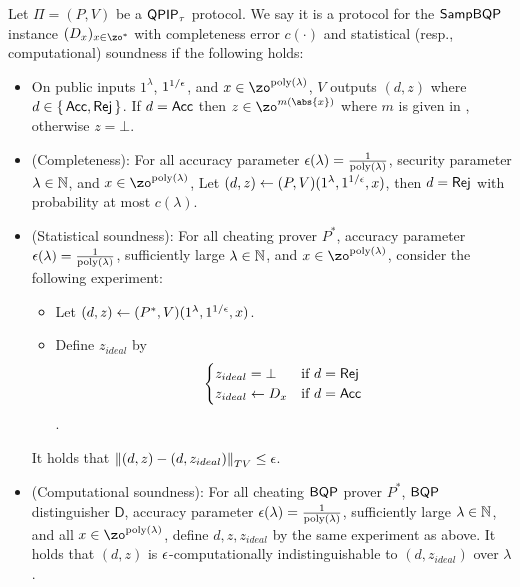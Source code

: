 \begin{definition}
    \label{dfn:stats-secure-proto-sampbqp}
    Let $\Pi=(P, V)$ be a $\operatorname{\mathsf{QPIP}}_\tau$ protocol.
    We say it is a protocol for the $\operatorname{\mathsf{SampBQP}}$ instance $(D_x)_{x\in\zo^*}$ with completeness error $c(\cdot)$ and statistical (resp., computational) soundness if the following holds:
    \begin{itemize}
        \item On public inputs $1^\lambda$, $1^{1/\epsilon}$, and $x\in\zo^{\poly(\lambda)}$, $V$ outputs $(d, z)$ where $d\in\set{\mathsf{Acc}, \mathsf{Rej}}$.
            If $d=\mathsf{Acc}$ then $z\in\zo^{m(\abs{x})}$ where $m$ is given in , otherwise $z=\bot$.
        \item (Completeness):
            For all accuracy parameter $\epsilon(\lambda)=\frac{1}{\operatorname*{\operatorname{poly}}(\lambda)}$,
            security parameter $\lambda\in\mathbb{N}$,
            and $x\in\zo^{\poly(\lambda)}$,
            Let $(d, z)\leftarrow(P, V)(1^\lambda, 1^{1/\epsilon}, x)$, then $d=\mathsf{Rej}$ with probability at most $c(\lambda)$.
        \item (Statistical soundness): For all cheating prover $P^*$,
            accuracy parameter $\epsilon(\lambda)=\frac{1}{\operatorname*{\operatorname{poly}}(\lambda)}$,
            sufficiently large $\lambda\in\mathbb{N}$, and $x\in\zo^{\poly(\lambda)}$,
            consider the following experiment:
            \begin{itemize}
                \item Let $(d, z)\leftarrow(P^*, V)(1^\lambda, 1^{1/\epsilon}, x)$.
                \item Define $z_{ideal}$ by
                $$\begin{cases}
                    z_{ideal}=\bot & \text{if } d=\mathsf{Rej}\\
                    z_{ideal}\leftarrow D_x & \text{if } d=\mathsf{Acc}
                \end{cases}$$.
            \end{itemize}
            It holds that $\left\lVert(d,z)-(d,z_{ideal})\right\rVert_{TV}\leq\epsilon$.
		\item (Computational soundness):
        For all cheating $\operatorname{\mathsf{BQP}}$ prover $P^*$, $\operatorname{\mathsf{BQP}}$ distinguisher $\mathsf{D}$, accuracy parameter $\epsilon(\lambda)=\frac{1}{\operatorname*{\operatorname{poly}}(\lambda)}$,
            sufficiently large $\lambda\in\mathbb{N}$, and all $x\in\zo^{\poly(\lambda)}$,
            define $d, z, z_{ideal}$ by the same experiment as above.
            It holds that $(d, z)$ is $\epsilon$-computationally indistinguishable to $(d, z_{ideal})$ over $\lambda$.
    \end{itemize}
\end{definition}

